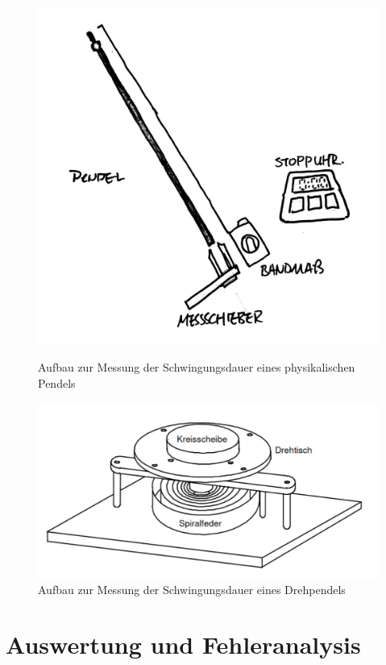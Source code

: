 \documentclass[11pt,a4paper]{article} %
\begin{document}
\begin{figure}[h]
\centering
\includegraphics[scale=0.1]{Abb1}
\caption{Aufbau zur Messung der Schwingungsdauer eines physikalischen Pendels}
\includegraphics[scale=0.5]{Abb2}
\caption{Aufbau zur Messung der Schwingungsdauer eines Drehpendels}



\end{figure}

\FloatBarrier
\section{Auswertung und Fehleranalysis}
\end{document}
